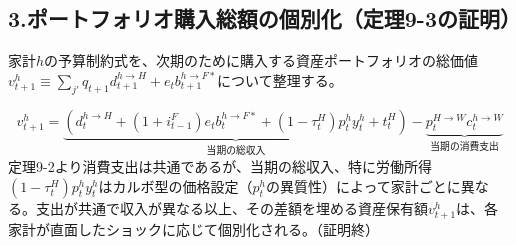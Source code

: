 \subsection*{3.ポートフォリオ購入総額の個別化（定理9-3の証明）}
\label{sec:appendix_risk_sharing_sub3}
家計\(h\)の予算制約式を、次期のために購入する資産ポートフォリオの総価値\(v_{t+1}^h\equiv\sum_{j'}q_{t+1}d_{t+1}^{h\to H}+e_tb_{t+1}^{h\to F*}\)について整理する。



\begin{equation}
v_{t+1}^h=\underbrace{\left(d_t^{h\to H}+(1+i_{t-1}^F)e_tb_t^{h\to F*}+(1-\tau_t^H)p_t^hy_t^h+t_t^H\right)}_{\text{当期の総収入}}-\underbrace{p_t^{H\to W}c_t^{h\to W}}_{\text{当期の消費支出}}
\label{eq:appendix_risk_sharing_sub3_portfolio_dynamics}
\end{equation}
定理9-2より消費支出は共通であるが、当期の総収入、特に労働所得\((1-\tau_t^H)p_t^hy_t^h\)はカルボ型の価格設定（\(p_t^h\)の異質性）によって家計ごとに異なる。支出が共通で収入が異なる以上、その差額を埋める資産保有額\(v_{t+1}^h\)は、各家計が直面したショックに応じて個別化される。（証明終）